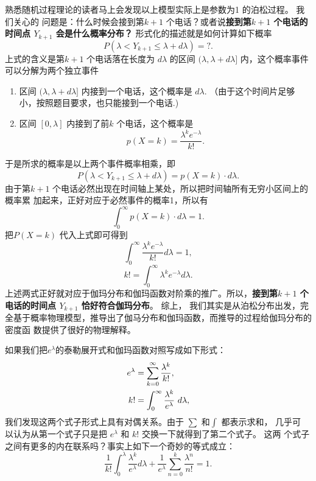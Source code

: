 {熟悉随机过程理论的读者马上会发现以上模型实际上是参数为1 的泊松过程。 我们关心的
问题是：什么时候会接到第${k+1}$ 个电话？或者说{\bf 接到第$k+1$ 个电话的时间点
$Y_{k+1}$ 会是什么概率分布？} 形式化的描述就是如何计算如下概率
$$ P(\lambda < Y_{k+1} \le \lambda +  d\lambda) = ? .$$
上式的含义是第$k+1$ 个电话落在长度为 $d\lambda$ 的区间 $(\lambda, \lambda +
d\lambda] $ 内，这个概率事件可以分解为两个独立事件
\begin{enumerate}
\item 区间 $(\lambda, \lambda +  d\lambda] $ 内接到一个电话，这个概率是 $d \lambda .$ （由于这个时间片足够小，按照题目要求，也只能接到一个电话.)
\item 区间 $[0, \lambda]$ 内接到了前$k$ 个电话，这个概率是 
$$ p(X=k) = \frac{\lambda^k e^{-\lambda}}{k!} .$$
\end{enumerate}
于是所求的概率是以上两个事件概率相乘，即
$$ P(\lambda < Y_{k+1} \le \lambda +  d\lambda) = p(X=k) \cdot d \lambda .$$
由于第$k+1$ 个电话必然出现在时间轴上某处，所以把时间轴所有无穷小区间上的概率累
加起来，正好对应于必然事件的概率1，所以有
$$ \int_0^\infty  p(X=k) \cdot d \lambda  = 1 .$$
把$P(X=k)$ 代入上式即可得到 
$$ \int_0^\infty \frac{\lambda^k e^{-\lambda}}{k!}  d \lambda  = 1 ,$$
$$ k! = \int_0^\infty \lambda^k e^{-\lambda} d \lambda .$$
上述两式正好就对应于伽玛分布和伽玛函数对阶乘的推广。所以，{\bf  接到第$k+1$ 个
电话的时间点 $Y_{k+1}$ 恰好符合伽玛分布}。 综上， 我们其实是从泊松分布出发，完
全基于概率物理模型，推导出了伽马分布和伽玛函数，而推导的过程给伽玛分布的密度函
数提供了很好的物理解释。

如果我们把$e^\lambda$的泰勒展开式和伽玛函数对照写成如下形式：
\begin{align}
e^\lambda & =  \sum_{k=0}^{\infty} {\lambda^k \over k!} , \\
k! & =  \int_0^{\infty} {\lambda^k \over e^\lambda}\ d\lambda ,
\end{align}
我们发现这两个式子形式上具有对偶关系。由于 $\sum$ 和$\int$ 都表示求和， 几乎可
以认为从第一个式子只是把 $e^\lambda$ 和 $k!$ 交换一下就得到了第二个式子。 这两
个式子之间有更多的内在联系吗？事实上如下一个奇妙的等式成立：
\begin{equation}
\label{gamma-e-taylor}
\frac{1}{k!} \int_0^\lambda \frac{\lambda^k}{e^\lambda} d\lambda 
+ \frac{1}{e^\lambda} \sum_{n=0}^k \frac{\lambda^n}{n!} = 1 .
\end{equation}

}
